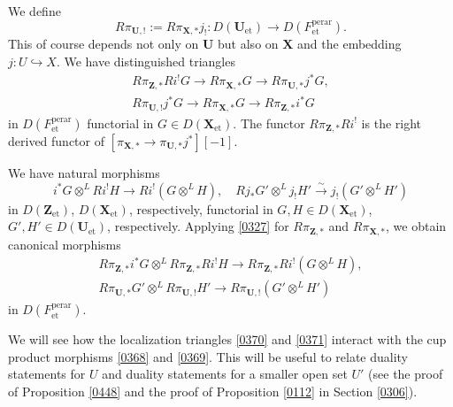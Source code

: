 \documentclass{amsart}
\theoremstyle{remark}
\numberwithin{equation}{subsection}
\newcommand{\into}{\hookrightarrow}
\newcommand{\isomto}{\overset{\sim}{\to}}
\newcommand{\tensor}{\mathbin{\otimes}}
\newcommand{\et}{\mathrm{et}}
\newcommand{\perar}{\mathrm{perar}}
\newcommand{\alg}[1]{\mathbf{#1}}
\begin{document}
We define
	\[
			R \pi_{\alg{U}, !}
		:=
			R \pi_{\alg{X}, \ast}
			j_{!}
		\colon
			D(\alg{U}_{\et})
		\to
			D(F^{\perar}_{\et}).
	\]
This of course depends not only on $\alg{U}$
but also on $\alg{X}$ and the embedding $j \colon U \into X$.
We have distinguished triangles
	\begin{gather} \label{0370}
				R \pi_{\alg{Z}, \ast} R i^{!} G
			\to
				R \pi_{\alg{X}, \ast} G
			\to
				R \pi_{\alg{U}, \ast} j^{\ast} G,
		\\ \label{0371}
				R \pi_{\alg{U}, !} j^{\ast} G
			\to
				R \pi_{\alg{X}, \ast} G
			\to
				R \pi_{\alg{Z}, \ast} i^{\ast} G
	\end{gather}
in $D(F^{\perar}_{\et})$ functorial in $G \in D(\alg{X}_{\et})$.
The functor $R \pi_{\alg{Z}, \ast} R i^{!}$ is the right derived functor of
$[\pi_{\alg{X}, \ast} \to \pi_{\alg{U}, \ast} j^{\ast}][-1]$.

We have natural morphisms
	\begin{equation} \label{0364}
				i^{\ast} G \tensor^{L} R i^{!} H
			\to
				R i^{!}(G \tensor^{L} H),
		\quad
				R j_{\ast} G' \tensor^{L} j_{!} H'
			\isomto
				j_{!}(G' \tensor^{L} H')
	\end{equation}
in $D(\alg{Z}_{\et})$, $D(\alg{X}_{\et})$, respectively,
functorial in $G, H \in D(\alg{X}_{\et})$,
$G', H' \in D(\alg{U}_{\et})$, respectively.
Applying \eqref{0327} for $R \pi_{\alg{Z}, \ast}$ and $R \pi_{\alg{X}, \ast}$,
we obtain canonical morphisms
	\begin{gather} \label{0368}
					R \pi_{\alg{Z}, \ast} i^{\ast} G
				\tensor^{L}
					R \pi_{\alg{Z}, \ast} R i^{!} H
			\to
				R \pi_{\alg{Z}, \ast} R i^{!}(G \tensor^{L} H),
		\\ \label{0369}
					R \pi_{\alg{U}, \ast} G'
				\tensor^{L}
					R \pi_{\alg{U}, !} H'
			\to
				R \pi_{\alg{U}, !}(G' \tensor^{L} H')
	\end{gather}
in $D(F^{\perar}_{\et})$.

We will see how the localization triangles \eqref{0370} and \eqref{0371}
interact with the cup product morphisms \eqref{0368} and \eqref{0369}.
This will be useful to relate duality statements for $U$
and duality statements for a smaller open set $U'$
(see the proof of Proposition \ref{0448}
and the proof of Proposition \ref{0112} in Section \ref{0306}).
\end{document}
